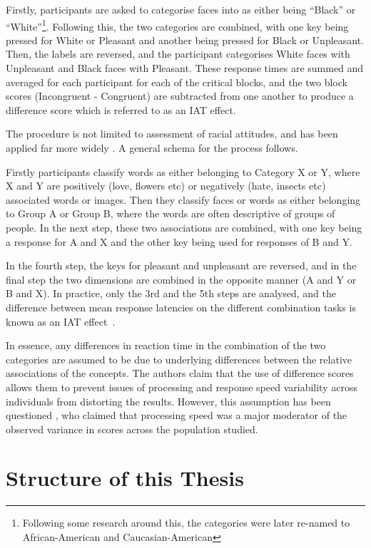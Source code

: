 Firstly, participants are asked to categorise faces into as either being ``Black'' or ``White''\footnote{Following some research around this, the categories were later re-named to African-American and Caucasian-American}. Following this, the two categories are combined, with one key being pressed for White or Pleasant and another being pressed for Black or Unpleasant. Then, the labels are reversed, and the participant categorises White faces with Unpleasant and Black faces with Pleasant. These response times are summed and averaged for each participant for each of the critical blocks, and the two block scores (Incongruent - Congruent) are subtracted from one another to produce a difference score which is referred to as an IAT effect. 

The procedure is not limited to assessment of racial attitudes, and has been applied far more widely \cite{Craeynest2008,Greenwald2009, Schmukle2008,Walker2008}.  A general schema for the process follows.   

Firstly participants classify words as either belonging to Category X or Y, where X and Y are positively (love, flowers etc) or negatively (hate, insects etc) associated words or images.  Then they classify faces or words
as either belonging to Group A or Group B, where the words are often descriptive of groups of people.  In the next step, these two associations are combined, with one key being a response for A and X and the other key being used for responses of B and Y. 

In the fourth step, the keys for pleasant and unpleasant are reversed, and in the final step the two dimensions are combined in the opposite manner (A and Y or B and X). In practice, only the 3rd and the 5th steps are analysed, and the difference between mean response latencies on the different combination tasks is known as an IAT effect~\cite{Greenwald1998}. 

In essence, any differences in reaction time in the combination of the two categories are assumed to be due to underlying differences between the relative associations of the concepts. The authors claim that the use of difference scores allows them to prevent issues of processing and response speed variability across individuals from distorting the results. However, this assumption has been questioned \cite{Blanton2006}, who claimed that processing speed was a major moderator of the observed variance in scores across the population studied.  

\section{Structure of this Thesis}
\label{sec:struct-this-thes}



